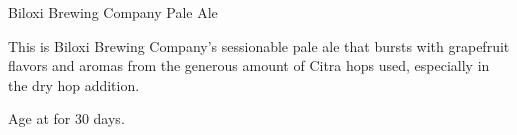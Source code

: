 \begin{recipie}{Biloxi Brewing Company Pale Ale}

\begin{aboutblock}
This is Biloxi Brewing Company's sessionable pale ale that bursts with grapefruit
flavors and aromas from the generous amount of Citra hops used, especially in the
dry hop addition.
\end{aboutblock}


\begin{methodandtiming}
 
\begin{mashsteps}
\end{mashsteps}

\begin{fermentationsteps}
\end{fermentationsteps}

\begin{directions}
Age at  for 30 days.
\end{directions}

\end{methodandtiming}

\pagebreak

\begin{ingredientsblock}

\begin{malts}
\end{malts}

\begin{hops}

\end{hops}

\begin{yeasts}
\end{yeasts}

\end{ingredientsblock}

\end{recipie}

